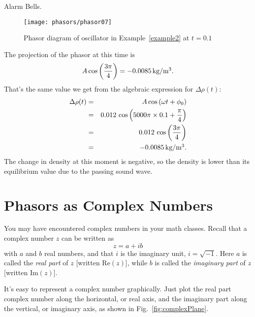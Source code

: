 \begin{exampleb}{Alarm Bells.}
\begin{solution}
\begin{figure}\begin{center}
 \texttt{[image: phasors/phasor07]} 
\caption{\label{fig:phasor07}Phasor diagram of oscillator in
Example~\ref{example2} at $t=0.1$}
\end{center}
\end{figure}

The projection of the phasor at this time is
\begin{equation}
A\cos{\left(\frac{3\pi}{4}\right)} = -0.0085\,\mbox{kg/m$^3$}. 
\end{equation}
That's the same value we get from the algebraic expression for 
$\Delta \rho (t)$:
\begin{eqnarray}
\Delta \rho (t) & = & A \cos{\left( \omega t + \phi_0\right)}\nonumber\\
               & = & 0.012\, \cos{\left(5000\pi\times 0.1 
                    + \frac{\pi}{4}\right)} \nonumber\\
               & = & 0.012\, \cos{\left(\frac{3\pi}{4}\right)}\nonumber\\
               & = &  -0.0085\,\mbox{kg/m$^3$}.
\end{eqnarray}
The change in density at this moment is negative, so the density is
lower than its equilibrium value due to the passing sound wave.
\end{solution}
\end{exampleb}


\section{Phasors as Complex Numbers}
\label{sec:phasor_complex_notation}

You may have encountered complex numbers in your math classes.
Recall that a complex number $z$ can be written as
\begin{equation}
z = a + ib
\end{equation}
with $a$ and $b$ real numbers, and that $i$ is the imaginary unit, 
$i = \sqrt{-1}$.  Here $a$ is called the \textit{real part} of  $z$ 
[written $\mbox{Re}(z)$], while $b$ is called the \textit{imaginary part} 
of $z$ [written $\mbox{Im}(z)$].

It's easy to represent a complex number  graphically.  Just plot the 
real part complex number along the horizontal, or real axis, 
and the imaginary part along the vertical, or imaginary axis,
as shown in Fig.~\ref{fig:complexPlane}.

